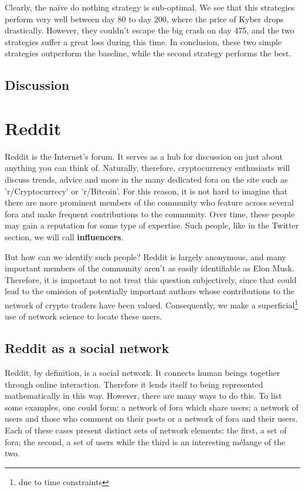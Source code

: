 \documentclass[twoside]{report}
\begin{document}
\begin{spacing}{1}
Clearly, the naïve do nothing strategy is sub-optimal. We see that this strategies perform very well between day 80 to day 200, where the price of Kyber drops drastically. However, they couldn't escape the big crash on day 475, and the two strategies suffer a great loss during this time. In conclusion, these two simple strategies outperform the baseline, while the second strategy performs the best.

\subsection{Discussion}

\section{Reddit}\label{sec:reddit}
Reddit is the Internet's forum. It serves as a hub for discussion on just about anything you can think of. Naturally, therefore, cryptocurrency enthusiasts will discuss trends, advice and more in the many dedicated fora on the site such as 'r/Cryptocurrecy' or 'r/Bitcoin'. For this reason, it is not hard to imagine that there are more prominent members of the community who feature across several fora and make frequent contributions to the community. Over time, these people may gain a reputation for some type of expertise. Such people, like in the Twitter section, we will call  \textbf{influencers}. 

But how can we identify such people? Reddit is largely anonymous, and many important members of the community aren't as easily identifiable as Elon Musk. Therefore, it is important to not treat this question subjectively, since that could lead to the omission of potentially important authors whose contributions to the network of crypto traders have been valued. Consequently, we make a superficial\footnote{due to time constraints} use of network science to locate these users. 

\subsection{Reddit as a social network}\label{sec:redditSN}

Reddit, by definition, is a social network. It connects human beings together through online interaction. Therefore it lends itself to being represented mathematically in this way. However, there are many ways to do this. To list some examples, one could form: a network of fora which share users; a network of users and those who comment on their posts or a network of fora and their users. Each of these cases present distinct sets of network elements: the first, a set of fora; the second, a set of users while the third is an interesting mélange of the two. 


\end{spacing}
\end{document}
